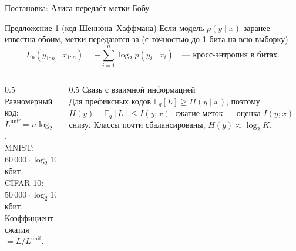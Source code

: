 \documentclass[aspectratio=169,10pt]{beamer}
\newcommand{\E}{\mathbb{E}}
\newcommand{\yx}{y_{1:n}\mid x_{1:n}}
\begin{document}
\begin{frame}{Постановка: Алиса передаёт метки Бобу}
  \centering

  \vspace{0.3em}
  \raggedright
  \begin{block}{Предложение 1 (код Шеннона--Хаффмана)}
    Если модель $p(y\mid x)$ заранее известна обоим, метки передаются за (с точностью до 1 бита на всю выборку)
    \[
      L_p(\yx)=-\sum_{i=1}^n\log_2 p(y_i\mid x_i)\quad\text{--- кросс-энтропия в битах.}
    \]
  \end{block}
  \begin{columns}[T]
    \begin{column}{0.5\textwidth}
      \textcolor{structure}{Равномерный код}: $L^{\mathrm{unif}}=n\log_2K$.\\
      MNIST: $60\,000\cdot\log_2 10\approx199$ кбит.\\
      CIFAR-10: $50\,000\cdot\log_2 10\approx166$ кбит.\\[2pt]
      Коэффициент сжатия $=L/L^{\mathrm{unif}}$.
    \end{column}
    \begin{column}{0.5\textwidth}
      \textcolor{structure}{Связь с взаимной информацией}\\
      Для префиксных кодов $\E_q[L]\ge H(y\mid x)$, поэтому $H(y)-\E_q[L]\le I(y;x)$: сжатие меток --- оценка $I(y;x)$ снизу. Классы почти сбалансированы, $H(y)\approx\log_2K$.
    \end{column}
  \end{columns}
\end{frame}
\end{document}
